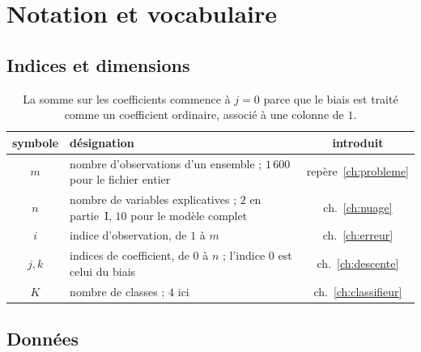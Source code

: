 \chapter{Notation et vocabulaire}
\label{ann:notation}


\section{Indices et dimensions}

\begin{table}[htbp]
\centering
\begin{tabular}{c>{\raggedright\arraybackslash}p{74mm}c}
\toprule
symbole & désignation & introduit \\
\midrule
$m$ & nombre d'observations d'un ensemble ; $1\,600$ pour le fichier entier
  & repère~\ref{ch:probleme} \\
$n$ & nombre de variables explicatives ; $2$ en partie~I, $10$ pour le modèle
    complet & ch.~\ref{ch:nuage} \\
$i$ & indice d'observation, de $1$ à $m$ & ch.~\ref{ch:erreur} \\
$j,k$ & indices de coefficient, de $0$ à $n$ ; l'indice $0$ est celui du biais
  & ch.~\ref{ch:descente} \\
$K$ & nombre de classes ; $4$ ici & ch.~\ref{ch:classifieur} \\
\bottomrule
\end{tabular}
\caption{La somme sur les coefficients commence à $j=0$ parce que le biais est
traité comme un coefficient ordinaire, associé à une colonne de $1$.}
\label{tab:not-indices}
\end{table}

\section{Données}

